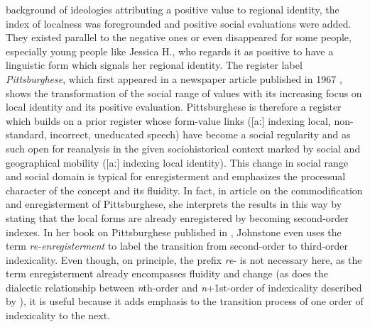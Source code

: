 background of ideologies attributing a positive value to regional identity, the index of localness was foregrounded and positive social evaluations were added. They existed parallel to the negative ones or even disappeared for some people, especially young people like Jessica H., who regards it as positive to have a linguistic form which signals her regional identity. The register label \textit{Pittsburghese}, which first appeared in a newspaper article published in 1967 \citep[95]{Johnstone2006}, shows the transformation of the social range of values with its increasing focus on local identity and its positive evaluation. Pittsburghese is therefore a register which builds on a prior register whose form-value links ([aː] indexing local, non-standard, incorrect, uneducated speech) have become a social regularity and as such open for reanalysis in the given sociohistorical context marked by social and geographical mobility ([aː] indexing local identity). This change in social range and social domain is typical for enregisterment and emphasizes the processual character of the concept and its fluidity. In fact, in  article on the commodification and enregisterment of Pittsburghese, she interprets the results in this way by stating that the local forms are already enregistered by becoming second-order indexes. In her book on Pittsburghese published in \citeyear{Johnstone2013}, Johnstone even uses the term \textit{re-enregisterment} to label the transition from second-order to third-order indexicality. Even though, on principle, the prefix \emph{re}- is not necessary here, as the term enregisterment already encompasses fluidity and change (as does the dialectic relationship between \emph{n}th-order and \emph{n}+1st-order of indexicality described by \citealt{Silverstein2003}), it is useful because it adds emphasis to the transition process of one order of indexicality to the next.


